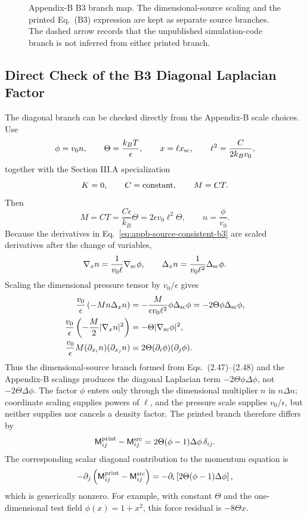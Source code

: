 \begin{figure}[htbp]
\centering
\resizebox{0.88\linewidth}{!}{}
\caption{Appendix-B B3 branch map.  The dimensional-source scaling and the
printed Eq.~(B3) expression are kept as separate source branches.  The dashed
arrow records that the unpublished simulation-code branch is not inferred from
either printed branch.}
\label{fig:appendix-b-b3-branch-map}
\end{figure}

\subsection*{Direct Check of the B3 Diagonal Laplacian Factor}

The diagonal branch can be checked directly from the Appendix-B scale choices.
Use
\[
  \phi=v_0n,
  \qquad
  \Theta=\frac{k_BT}{\epsilon},
  \qquad
  x=\ell x_{\rm sc},
  \qquad
  \ell^2=\frac{C}{2k_Bv_0},
\]
together with the Section III.A specialization
\[
  K=0,
  \qquad C=\hbox{constant},
  \qquad M=CT .
\]
Then
\[
  M=CT=\frac{C\epsilon}{k_B}\Theta
    =2\epsilon v_0\ell^2\Theta,
  \qquad
  n=\frac{\phi}{v_0}.
\]
Because the derivatives in Eq.~\eqref{eq:appb-source-consistent-b3} are scaled
derivatives after the change of variables,
\[
  \nabla_x n=\frac{1}{v_0\ell}\nabla_{\rm sc}\phi,
  \qquad
  \Delta_x n=\frac{1}{v_0\ell^2}\Delta_{\rm sc}\phi .
\]
Scaling the dimensional pressure tensor by \(v_0/\epsilon\) gives
\begin{align}
  \frac{v_0}{\epsilon}\left(-Mn\Delta_x n\right)
  &=-\frac{M}{\epsilon v_0\ell^2}\phi\Delta_{\rm sc}\phi
    =-2\Theta\phi\Delta_{\rm sc}\phi,\label{eq:appb-direct-lap-factor}\\
  \frac{v_0}{\epsilon}\left(-\frac{M}{2}|\nabla_x n|^2\right)
  &=-\Theta|\nabla_{\rm sc}\phi|^2,\label{eq:appb-direct-grad-square}\\
  \frac{v_0}{\epsilon}M(\partial_{x_i}n)(\partial_{x_j}n)
  &=2\Theta(\partial_i\phi)(\partial_j\phi).
    \label{eq:appb-direct-gradient-stress}
\end{align}
Thus the dimensional-source branch formed from Eqs.~(2.47)--(2.48) and the
Appendix-B scalings produces the diagonal Laplacian term
\(-2\Theta\phi\Delta\phi\), not \(-2\Theta\Delta\phi\).  The factor
\(\phi\) enters only through the dimensional multiplier \(n\) in
\(n\Delta n\); coordinate scaling supplies powers of \(\ell\), and the
pressure scale supplies \(v_0/\epsilon\), but neither supplies nor cancels a
density factor.  The printed branch therefore differs by
\[
  \mathsf{M}^{\rm print}_{ij}-\mathsf{M}^{\rm src}_{ij}
  =2\Theta(\phi-1)\Delta\phi\,\delta_{ij}.
\]
The corresponding scalar diagonal contribution to the momentum equation is
\[
  -\partial_j\left(\mathsf{M}^{\rm print}_{ij}
       -\mathsf{M}^{\rm src}_{ij}\right)
  =-\partial_i\left[2\Theta(\phi-1)\Delta\phi\right],
\]
which is generically nonzero.  For example, with constant \(\Theta\) and the
one-dimensional test field \(\phi(x)=1+x^2\), this force residual is
\(-8\Theta x\).


